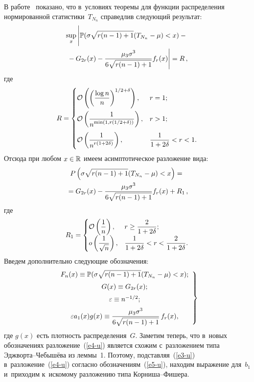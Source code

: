 \begin{multicols}{2}
В работе~\cite{BenKorGal} показано, что в~условиях теоремы для функции 
распределения нормированной статистики~$T_{N_n}$ справедлив следующий результат:
\begin{multline*}
\sup\limits_{x} \left| 
\vphantom{\fr{\mu_3 \sigma^{3}}{6\sqrt{r(n-1)+1}}}
\mathbb{P}(\sigma\sqrt{r(n-1)+1}(T_{N_n}-\mu)<x) -{} \right. \\
 \left. {}-G_{2r}(x)-\fr{\mu_3 \sigma^{3}}{6\sqrt{r(n-1)+1}}f_r(x)\right| =R\,,
\end{multline*}
где 
$$R = \begin{cases}
\mathcal{O}\left(\left(\displaystyle\frac{\displaystyle \log{n}\mathstrut}{\displaystyle n\mathstrut}\right)^{{1}/{2}+\delta}\right) , & r=1; \\[12pt]
\mathcal{O}\left(
\displaystyle\frac{\displaystyle 1\mathstrut}{\displaystyle n^{\min(1, r({1}/{2}+\delta))}\mathstrut}\right), & r>1;\\[12pt]
 \mathcal{O}\left(\displaystyle\frac{\displaystyle 1\mathstrut}{\displaystyle n^{r(1+2\delta)}\mathstrut}\right), & \displaystyle\frac{\displaystyle 1\mathstrut}{\displaystyle 1+2\delta\mathstrut}<r<1.
        \end{cases}
        $$
Отсюда при любом $x \hm\in \mathbb{R}$ имеем асимптотическое разложение вида:
 \begin{multline}
P\left(\sigma\sqrt{r(n-1)+1}(T_{N_n}-\mu)<x\right) ={}\\
{} = G_{2r}(x) -\displaystyle\frac{\displaystyle \mu_3 \sigma^{3}\mathstrut}{\displaystyle 6\sqrt{r(n-1)+1}\mathstrut}f_r(x)+R_1\,,
\label{e4-u}
\end{multline}
где
$$ 
R_1 = \begin{cases}      \mathcal{O}\left(\displaystyle\frac{\displaystyle 1\mathstrut}{\displaystyle n\mathstrut}\right)          , & r\ge \displaystyle\frac{\displaystyle 2\mathstrut}{\displaystyle 1+2\delta\mathstrut} ; \\
                            o\left(\displaystyle\frac{\displaystyle 1\mathstrut}{\displaystyle \sqrt{n}\mathstrut}\right)             , & \displaystyle\frac{\displaystyle 1\mathstrut}{\displaystyle 1+2\delta\mathstrut}<r<\frac{2}{1+2\delta}.
            \end{cases}$$
Введем дополнительно следующие обозначения:
\begin{equation}
\left.
\begin{array}{c}
 F_n(x)                     \equiv \mathbb{P}(\sigma\sqrt{r(n-1)+1}(T_{N_n}-\mu)<x);    \\[6pt]
 G(x)                       \equiv G_{2r}(x);                                           \\[6pt]
 \varepsilon                \equiv n^{-{1}/{2}};                                    \\[6pt]
 \varepsilon a_1(x) g(x)    \equiv \displaystyle\frac{\displaystyle \mu_3 \sigma^{3}\mathstrut}{\displaystyle 6\sqrt{r(n-1)+1}\mathstrut}\,f_r(x),
\end{array}
\right\}
\label{e5-u}
\end{equation}
где $g(x)$ есть плотность распределения~$G$.
Заметим теперь, что в~новых обозначениях разложение~(\ref{e4-u}) 
является схожим с~разложением типа Эджворта--Че\-бы\-шё\-ва из леммы~1. Поэтому, 
подставляя~(\ref{e3-u}) в~разложение~(\ref{e4-u}) 
согласно обозначениям~(\ref{e5-u}),  находим выражение для~$b_1$ 
и~приходим  к~искомому разложению типа Корниша--Фишера. 


\end{multicols}
